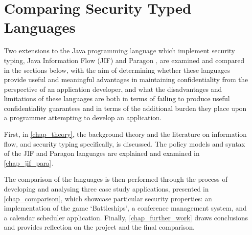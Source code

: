 \section{Comparing Security Typed Languages}

Two extensions to the Java programming language which implement security typing, Java Information Flow (JIF) \cite{jifwebsite} and Paragon \cite{parawebsite}, are examined and compared in the sections below, with the aim of determining whether these languages provide useful and meaningful advantages in maintaining confidentiality from the perspective of an application developer, and what the disadvantages and limitations of these languages are both in terms of failing to produce useful confidentiality guarantees and in terms of the additional burden they place upon a programmer attempting to develop an application.

First, in \autoref{chap_theory}, the background theory and the literature on information flow, and security typing specifically, is discussed. The policy models and syntax of the JIF and Paragon languages are explained and examined in \autoref{chap_jif_para}.

The comparison of the languages is then performed through the process of developing and analysing three case study applications, presented in \autoref{chap_comparison}, which showcase particular security properties: an implementation of the game `Battleships', a conference management system, and a calendar scheduler application. Finally, \autoref{chap_further_work} draws conclusions and provides reflection on the project and the final comparison.